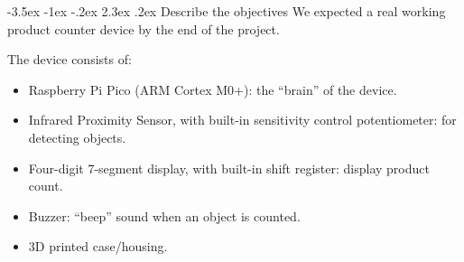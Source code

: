 \documentclass[a4paper,twoside]{report}
\makeatletter
\renewcommand\section{\@startsection {section}{1}{-1em}%
  {-3.5ex \@plus -1ex \@minus -.2ex}%
  {2.3ex \@plus.2ex}%
  {\normalfont\Large\bfseries}}
\makeatother
\begin{document}
\section{Describe the objectives}
We expected a real working product counter device by the end of the project. 

The device consists of:
\begin{itemize}
\item Raspberry Pi Pico (ARM Cortex M0+): the ``brain'' of the device.
\item Infrared Proximity Sensor, with built-in sensitivity control potentiometer: for detecting objects.
\item Four-digit 7-segment display, with built-in shift register: display product count.
\item Buzzer: ``beep'' sound when an object is counted.
\item 3D printed case/housing.
\end{itemize}
\end{document}
